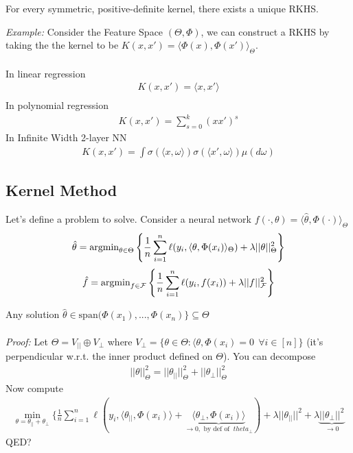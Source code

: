 \begin{theorem}
	 For every symmetric, positive-definite kernel, there exists a unique RKHS.
\end{theorem}
\begin{sidework}
	\emph{Example:} Consider the Feature Space $(\Theta, \Phi)$, we can construct a RKHS by taking the the kernel to be $K(x,x') = \langle \Phi(x), \Phi(x') \rangle_{\Theta}$.\\
	\\
	In linear regression
	\begin{align}
		K(x,x') = \langle x, x'\rangle\\
	\end{align}
	In polynomial regression
	\begin{align}
		K(x,x') = \sum_{s=0}^k (x x')^s
	\end{align}
	In Infinite Width 2-layer NN
	\begin{align}
		K(x,x') = \int \sigma(\langle x, \omega \rangle ) \sigma(\langle x', \omega\rangle ) \mu(d\omega)
	\end{align}
\end{sidework}
\subsection{Kernel Method}
Let's define a problem to solve. Consider a neural network $f(\cdot, \theta) = \langle \hat \theta, \Phi(\cdot)\rangle_{\Theta}$ 
\begin{align}
	\hat \theta = \operatorname{argmin}_{ \theta \in \Theta} \left \{ \frac{1}{n} \sum_{i=1}^n \ell(y_i, \langle \theta, \Phi(x_i)\rangle_{\Theta} ) + \lambda ||\theta||^2_{\Theta} \right\}
\end{align}
\begin{align}
	\hat f = \operatorname{argmin}_{f \in \mathcal F} \left \{ \frac{1}{n} \sum_{i=1}^n \ell(y_i, f(x_i)) + \lambda ||f||_{\mathcal F}^2  \right \}
\end{align}

\begin{theorem}
	 Any solution $\hat \theta \in \text{span} (\Phi(x_1), ..., \Phi(x_n)\} \subseteq \Theta$\\
	\\
	\emph{Proof:} Let $\Theta = V_{||} \oplus V_{\perp}$ where $V_{\perp} = \{\theta \in \Theta: \langle \theta, \Phi(x_i) = 0~~ \forall i \in [n] \}$ (it's perpendicular w.r.t. the inner product defined on $\Theta$). You can decompose 
\begin{align}
	||\theta||^2_{\Theta} = ||\theta_{||}||^2_{\Theta} +||\theta_{\perp}||^2_{\Theta}
\end{align}
Now compute
\begin{align}
	\min_{\theta = \theta_{||} + \theta_{\perp}} \{ \frac{1}{n} \sum_{i=1}^n \ell(y_i , \langle \theta_{||}, \Phi(x_i)\rangle + \underbrace{\langle \theta_{\perp}, \Phi(x_i)\rangle}_{\to 0, \text{ by def of } \ theta_{\perp}} ) + \lambda ||\theta_{||}||^2 + \lambda \underbrace{||\theta_{\perp}||^2 }_{\to 0}
\end{align}
QED?
\end{theorem}
